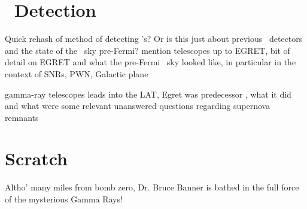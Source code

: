 \section{\gam~Detection}\label{gamAstr:Detect}
Quick rehash of method of detecting \gam's? Or is this just about previous \gam ~detectors and the state of the \gam~sky pre-Fermi?  mention telescopes up to EGRET, bit of detail on EGRET and what the pre-Fermi \gam~sky looked like, in particular in the context of SNRs, PWN, Galactic plane

gamma-ray telescopes leads into the LAT, Egret was  predecessor , what it did and what were some relevant unanswered questions regarding supernova remnants 

\citep{Esposito96}
\citep{Sturner95}

\section{Scratch}


Altho' many miles from bomb zero, Dr. Bruce Banner is bathed in the full force of the mysterious Gamma Rays!
